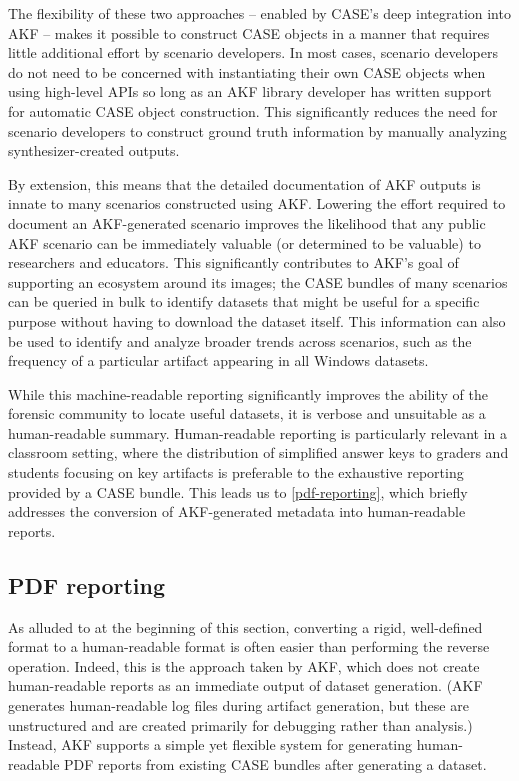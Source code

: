 The flexibility of these two approaches -- enabled by CASE's deep
integration into AKF -- makes it possible to construct CASE objects in a
manner that requires little additional effort by scenario developers. In
most cases, scenario developers do not need to be concerned with
instantiating their own CASE objects when using high-level APIs so long
as an AKF library developer has written support for automatic CASE
object construction. This significantly reduces the need for scenario
developers to construct ground truth information by manually analyzing
synthesizer-created outputs.

By extension, this means that the detailed documentation of AKF outputs
is innate to many scenarios constructed using AKF. Lowering the effort
required to document an AKF-generated scenario improves the likelihood
that any public AKF scenario can be immediately valuable (or determined
to be valuable) to researchers and educators. This significantly
contributes to AKF's goal of supporting an ecosystem around its images;
the CASE bundles of many scenarios can be queried in bulk to identify
datasets that might be useful for a specific purpose without having to
download the dataset itself. This information can also be used to
identify and analyze broader trends across scenarios, such as the
frequency of a particular artifact appearing in all Windows datasets.

While this machine-readable reporting significantly improves the ability
of the forensic community to locate useful datasets, it is verbose and
unsuitable as a human-readable summary. Human-readable reporting is
particularly relevant in a classroom setting, where the distribution of
simplified answer keys to graders and students focusing on key artifacts
is preferable to the exhaustive reporting provided by a CASE bundle.
This leads us to \autoref{pdf-reporting}, which briefly addresses
the conversion of AKF-generated metadata into human-readable reports.

\subsection{PDF reporting}\label{pdf-reporting}

As alluded to at the beginning of this section, converting a rigid,
well-defined format to a human-readable format is often easier than
performing the reverse operation. Indeed, this is the approach taken by
AKF, which does not create human-readable reports as an immediate output
of dataset generation. (AKF generates human-readable log files during
artifact generation, but these are unstructured and are created
primarily for debugging rather than analysis.) Instead, AKF supports a
simple yet flexible system for generating human-readable PDF reports
from existing CASE bundles after generating a dataset.

